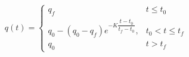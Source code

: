         \begin{equation} \label{eq:funcao_exponencial_descendente}
            q(t) =
            \begin{cases}
                q_f & t \leq t_0 \\
                q_0 - (q_0 - q_f) e^{-K\dfrac{t - t_0}{t_f - t_0}} ,& t_0 < t \leq t_f \\
                q_0 & t > t_f
            \end{cases}
        \end{equation}